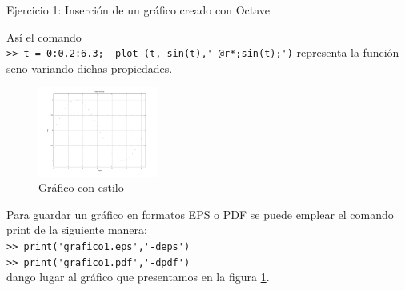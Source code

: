\documentclass{beamer}
\begin{document}
\begin{frame}[fragile]
\begin{exampleblock}{Ejercicio 1: Inserci\'on de un gr\'afico creado con Octave}
{\small As\'i el comando
\\%
\verb|>> t = 0:0.2:6.3;  plot (t, sin(t),'-@r*;sin(t);')|
representa la funci\'on seno variando dichas propiedades.
\begin{figure}
\begin{center}
\includegraphics[width=0.35\textwidth]{graficos/sin.pdf}
\end{center}
\caption{Gr\'afico con estilo \label{figura:sinestilo}
}
\end{figure}
Para guardar un gr\'afico en formatos EPS o PDF se puede emplear el comando print de la siguiente manera:
\\
\verb|>> print('grafico1.eps','-deps')| \\
\verb|>> print('grafico1.pdf','-dpdf')| \\
dango lugar al gr\'afico que presentamos en la figura \ref{figura:sinestilo}.
}
\end{exampleblock}
\end{frame}
\end{document}
